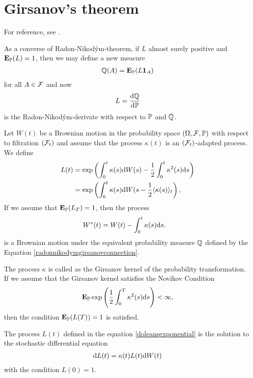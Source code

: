 \section{Girsanov's theorem}
\label{sec:girsanov}

For reference, see \textcite[pp. 161--171]{oksendal2003stochastic}.

As a converse of Radon-Nikod\'{y}m-theorem, if $L$ almost surely positive and $\operatorname{\boldsymbol{\mathrm{E}}}_{\mathbb{P}} (L) = 1$, then we may define a new measure
	\begin{align}
    \label{radonnikodymgirsanovconnection}
		\mathbb{Q}(A) = \operatorname{\boldsymbol{\mathrm{E}}}_{\mathbb{P}} (L \boldsymbol{1}_A)
	\end{align}
for all $A \in \mathcal{F}$ and now 
	\begin{align}
		L = \frac{\mathrm{d} \mathbb{Q}}{\mathrm{d} \mathbb{P}}
	\end{align}
is the Radon-Nikod\'{y}m-derivate with respect to $\mathbb{P}$ and $\mathbb{Q}$. 

\begin{thm}
	Let $W(t)$ be a Brownian motion in the probability space $(\Omega, \mathcal{F}, \mathbb{P})$ with respect to filtration $(\mathcal{F}_t)$ and assume that the process $\kappa(t)$ is an $(\mathcal{F}_t)$-adapted process. We define
	\begin{align}
	\label{doleansexponential}
	L(t) &= \exp \left( \int_0^t \kappa(s) \mathrm{d} W(s) - \frac{1}{2} \int_0^t \kappa^2 (s) \mathrm{d} s \right) \\
	&= \exp \left( \int_0^t \kappa(s) \mathrm{d} W(s - \frac{1}{2} \langle \kappa(s) \rangle_t \right), 
	\end{align}
	If we assume that $\operatorname{\boldsymbol{\mathrm{E}}}_{\mathbb{P}} (L_T) = 1$, then the process
	\begin{align}
	W^*(t) &= W(t) - \int_0^t \kappa(s) \mathrm{d} s.
	\end{align}
	is a Brownian motion under the equivalent probability measure $\mathbb{Q}$ defined by the Equation \ref{radonnikodymgirsanovconnection}.
\end{thm}

The process $\kappa$ is called as the Girsanov kernel of the probability transformation. If we assume that the Girsanov kernel satisfies the Novikov Condition
  \begin{align}
    \operatorname{\boldsymbol{\mathrm{E}}}_{\mathbb{P}} \exp \left( \frac{1}{2} \int_0^T \kappa^2 (s) \mathrm{d} s \right) < \infty ,
  \end{align}
then the condition $\operatorname{\boldsymbol{\mathrm{E}}}_{\mathbb{P}} (L(T)) = 1$ is satisfied.

The process $L(t)$ defined in the equation \ref{doleansexponential} is the solution to the stochastic differential equation
  \begin{align}
    \mathrm{d} L(t) = \kappa(t) L(t) \mathrm{d} W(t)
  \end{align}
with the condition $L(0) = 1$.

